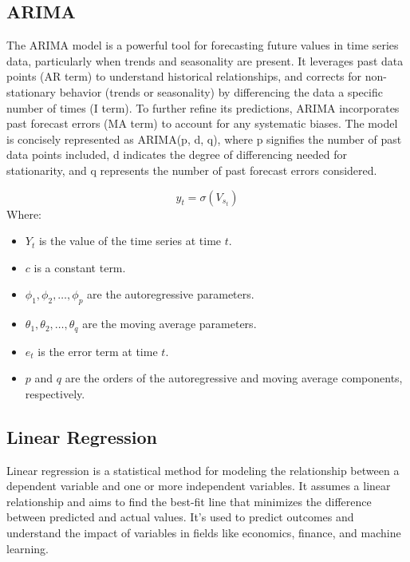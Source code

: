 \documentclass[conference]{IEEEtran}
\begin{document}
\subsection{ARIMA}

The ARIMA model is a powerful tool for forecasting future values in time series data, particularly when trends and seasonality are present. It leverages past data points (AR term) to understand historical relationships, and corrects for non-stationary behavior (trends or seasonality) by differencing the data a specific number of times (I term). To further refine its predictions, ARIMA incorporates past forecast errors (MA term) to account for any systematic biases. The model is concisely represented as ARIMA(p, d, q), where p signifies the number of past data points included, d indicates the degree of differencing needed for stationarity, and q represents the number of past forecast errors considered.

\[
y_t = \sigma(V_{s_{t}})
\]
Where:
\begin{itemize}
    \item $Y_t$ is the value of the time series at time $t$.
    \item $c$ is a constant term.
    \item $\phi_1, \phi_2, \ldots, \phi_p$ are the autoregressive parameters.
    \item $\theta_1, \theta_2, \ldots, \theta_q$ are the moving average parameters.
    \item $e_t$ is the error term at time $t$.
    \item $p$ and $q$ are the orders of the autoregressive and moving average components, respectively.
\end{itemize}




\subsection{Linear Regression}
Linear regression is a statistical method for modeling the relationship between a dependent variable and one or more independent variables. It assumes a linear relationship and aims to find the best-fit line that minimizes the difference between predicted and actual values. It's used to predict outcomes and understand the impact of variables in fields like economics, finance, and machine learning.
\end{document}
